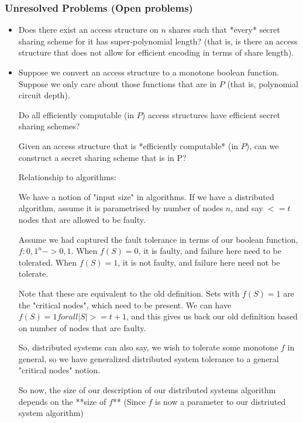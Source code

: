 \subsubsection{Unresolved Problems (Open problems)}
\begin{itemize}
    \item Does there exist an access structure on $n$ shares 
        such that *every* secret sharing scheme for it has super-polynomial
        length? (that is, is there an access structure that does not allow
        for efficient encoding in terms of share length).

    \item Suppose we convert an access structure to a monotone boolean function.
        Suppose we only care about those functions that are in $P$ 
        (that is, polynomial circuit depth).

        Do all efficiently computable (in $P$) access structures have
        efficient secret sharing schemes?

        Given an access structure that is *efficiently computable*
        (in $P$), can we construct a secret sharing scheme that is in P?


        Relationship to algorithms:

        We have a notion of "input size" in algorithms.
        If we have a distributed algorithm, assume it is parametrised by
        number of nodes $n$, and say $<= t$ nodes that are allowed to be faulty.


        Assume we had captured the fault tolerance in terms of our
        boolean function, $f: {0, 1}^n -> {0, 1}$. When
        $f(S) = 0$, it is faulty, and failure here need to be tolerated.
        When $f(S) = 1$, it is not faulty, and failure here need not be tolerate.

        Note that these are equivalent to the old definition. Sets with
        $f(S) = 1$ are the "critical nodes", which need to be present. We can
        have $f(S) = 1 forall |S| >= t + 1$, and this gives us back our
        old definition based on number of nodes that are faulty.

        So, distributed systems can also say, we wish to tolerate some
        monotone $f$ in general, so we have generalized distributed system
        tolerance to a general "critical nodes" notion.

        So now, the size of our description of our distributed systems
        algorithm depends on the **size of $f$** (Since $f$ is now a
        parameter to our distriuted system algorithm)


\end{itemize}
